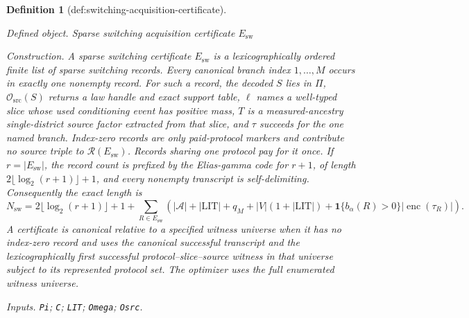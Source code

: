 \documentclass{article}
\newtheorem{definition}{Definition}
\begin{document}
\begin{definition}[def:switching-acquisition-certificate]\label{def:switching-acquisition-certificate}
\par\smallskip\noindent\emph{Defined object.} Sparse switching acquisition certificate \(E_{\mathrm{sw}}\)
\par\smallskip\noindent\emph{Construction.} A sparse switching certificate \(E_{\mathrm{sw}}\) is a lexicographically ordered finite list of sparse switching records.  Every canonical branch index \(1,\ldots,M\) occurs in exactly one nonempty record.  For such a record, the decoded \(S\) lies in \(\Pi\), \(\mathcal O_{\mathrm{src}}(S)\) returns a law handle and exact support table, \(\ell\) names a well-typed slice whose used conditioning event has positive mass, \(T\) is a measured-ancestry single-district source factor extracted from that slice, and \(\tau\) succeeds for the one named branch.  Index-zero records are only paid-protocol markers and contribute no source triple to \(\mathcal R(E_{\mathrm{sw}})\).  Records sharing one protocol pay for it once.  If \(r=|E_{\mathrm{sw}}|\), the record count is prefixed by the Elias-gamma code for \(r+1\), of length \(2\lfloor\log_2(r+1)\rfloor+1\), and every nonempty transcript is self-delimiting.  Consequently the exact length is
\[
 N_{\mathrm{sw}}
 =2\lfloor\log_2(r+1)\rfloor+1
  +\sum_{R\in E_{\mathrm{sw}}}
   \left(|\mathcal A|+|\mathrm{LIT}|+q_M+|V|(1+|\mathrm{LIT}|)
   +\mathbf 1\{b_{\alpha}(R)>0\}|\operatorname{enc}(\tau_R)|\right).
\]
 A certificate is canonical relative to a specified witness universe when it has no index-zero record and uses the canonical successful transcript and the lexicographically first successful protocol--slice--source witness in that universe subject to its represented protocol set.  The optimizer uses the full enumerated witness universe.
\par\smallskip\noindent\emph{Inputs.} \texttt{Pi}; \texttt{C}; \texttt{LIT}; \texttt{Omega}; \texttt{Osrc}.
\end{definition}
\end{document}
